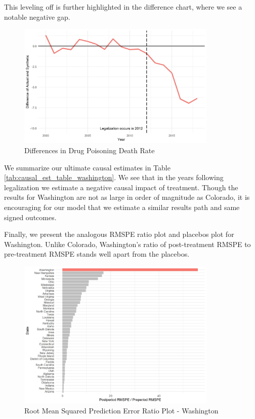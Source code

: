 \documentclass{article}
\begin{document}
This leveling off is further highlighted in the difference chart, where we see a notable negative gap.

\begin{figure}[H]
	\begin{center}
		\includegraphics[width=0.85\textwidth]{diffs_plot_washington}
	\end{center}
	\caption{Differences in Drug Poisoning Death Rate}
	\label{fig:diffs_plot_washington}
\end{figure}

We summarize our ultimate causal estimates in Table \ref{tab:causal_est_table_washington}. We see that in the years following legalization we estimate a negative causal impact of treatment. Though the results for Washington are not as large in order of magnitude as Colorado, it is encouraging for our model that we estimate a similar results path and same signed outcomes.



Finally, we present the analogous RMSPE ratio plot and placebos plot for Washington. Unlike Colorado, Washington's ratio of post-treatment RMSPE to pre-treatment RMSPE stands well apart from the placebos. 

\begin{figure}[H]
	\begin{center}
		\includegraphics[width=0.85\textwidth]{mspe_plot_washington}
	\end{center}
	\caption{Root Mean Squared Prediction Error Ratio Plot - Washington}
	\label{fig:mspe_plot_washington}
\end{figure}
\end{document}
